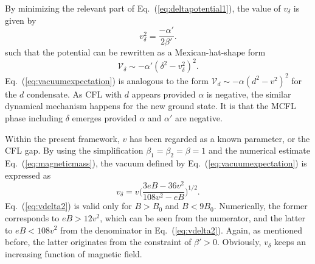 \documentclass[prd, showpacs,nofootinbib,amsmath,amssymb]{revtex4}
\begin{document}
By minimizing the relevant part of Eq.~(\ref{eq:deltapotential1}), the value of $v_\delta$ is given by
\begin{equation}
\label{eq:vacuumexpectation}
v_\delta^2 = \frac{- \alpha'} {2\beta'}.
\end{equation}
such that the potential can be rewritten as a Mexican-hat-shape form
\begin{equation}
\label{eq:deltapotential}
\mathcal{V}_\delta \sim - \alpha'(\delta^2 - v_\delta^2)^2.
\end{equation}
Eq.~(\ref{eq:vacuumexpectation}) is analogous to the form $\mathcal{V}_d \sim - \alpha (d^2 - v^2)^2$
for the $d$ condensate.
As CFL with $d$ appears provided $\alpha$ is negative, the similar dynamical mechanism happens for
the new ground state. It is that the MCFL phase including $\delta$ emerges provided $\alpha$ and
$\alpha'$ are negative.


Within the present framework, $v$ has been regarded as a known parameter, or the CFL gap.
By using the simplification $\beta_1=\beta_2=\beta = 1$ and the numerical estimate Eq.~(\ref{eq:magneticmass}),
the vacuum defined by Eq.~(\ref{eq:vacuumexpectation}) is expressed as
\begin{equation}\label{eq:vdelta2}
v_\delta = v \Big(\frac{3eB-36v^2}{108v^2-eB}\Big)^{1/2}.
\end{equation}
Eq.~(\ref{eq:vdelta2}) is valid only for $B > B_0$ and $B < 9B_0$. Numerically, the former
corresponds to $eB > 12v^2$, which can be seen from the numerator, and the latter to $eB < 108v^2$
from the denominator in Eq.~(\ref{eq:vdelta2}). Again, as mentioned before, the latter originates
from the constraint of $\beta'> 0$.
Obviously, $v_\delta$ keeps an increasing function of
magnetic field.
\end{document}
